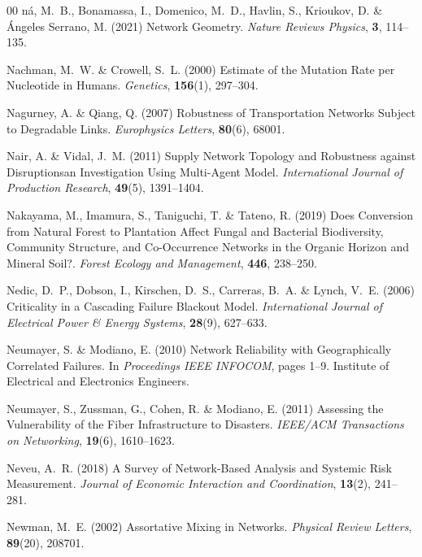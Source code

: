\documentclass{comnet-mod}
\begin{document}
\begin{thebibliography}{00}
{n}\'{a}, M.~B., Bonamassa, I., Domenico, M.~D., Havlin, S., Krioukov, D. {\&}
  \'{A}ngeles Serrano, M. (2021)  Network Geometry. {\em Nature Reviews
  Physics}, \textbf{3}, 114--135.

Nachman, M.~W. {\&} Crowell, S.~L. (2000)  {Estimate of the Mutation Rate per
  Nucleotide in Humans}. {\em {Genetics}}, \textbf{156}(1), 297--304.

Nagurney, A. {\&} Qiang, Q. (2007)  {Robustness of Transportation Networks
  Subject to Degradable Links}. {\em {Europhysics Letters}}, \textbf{80}(6),
  68001.

Nair, A. {\&} Vidal, J.~M. (2011)  {Supply Network Topology and Robustness
  against Disruptions\textendash an Investigation Using Multi-Agent Model}.
  {\em {International Journal of Production Research}}, \textbf{49}(5),
  1391--1404.

Nakayama, M., Imamura, S., Taniguchi, T. {\&} Tateno, R. (2019)  {Does
  Conversion from Natural Forest to Plantation Affect Fungal and Bacterial
  Biodiversity, Community Structure, and Co-Occurrence Networks in the Organic
  Horizon and Mineral Soil?}. {\em {Forest Ecology and Management}},
  \textbf{446}, 238--250.

Nedic, D.~P., Dobson, I., Kirschen, D.~S., Carreras, B.~A. {\&} Lynch, V.~E.
  (2006)  {Criticality in a Cascading Failure Blackout Model}. {\em
  {International Journal of Electrical Power \& Energy Systems}},
  \textbf{28}(9), 627--633.

Neumayer, S. {\&} Modiano, E. (2010)  {Network Reliability with Geographically
  Correlated Failures}. In {\em {Proceedings {{IEEE INFOCOM}}}}, pages 1--9.
  {Institute of Electrical and Electronics Engineers}.

Neumayer, S., Zussman, G., Cohen, R. {\&} Modiano, E. (2011)  {Assessing the
  Vulnerability of the Fiber Infrastructure to Disasters}. {\em {IEEE/ACM
  Transactions on Networking}}, \textbf{19}(6), 1610--1623.

Neveu, A.~R. (2018)  {A Survey of Network-Based Analysis and Systemic Risk
  Measurement}. {\em {Journal of Economic Interaction and Coordination}},
  \textbf{13}(2), 241--281.

Newman, M.~E. (2002)  {Assortative Mixing in Networks}. {\em {Physical Review
  Letters}}, \textbf{89}(20), 208701.


\end{thebibliography}
\end{document}
